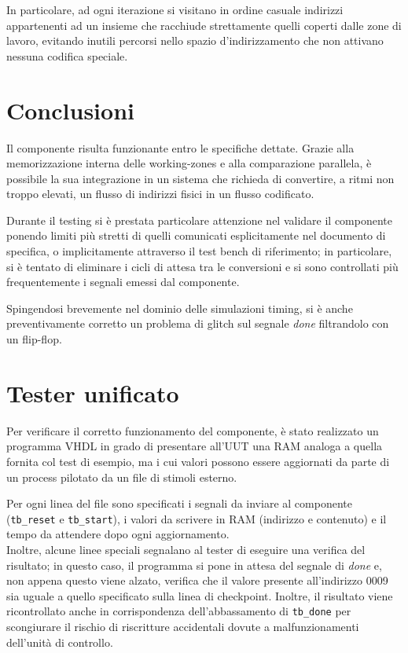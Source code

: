 \documentclass[11pt,a4paper]{article}
\begin{document}
In particolare, ad ogni iterazione si visitano in ordine casuale indirizzi appartenenti ad un insieme che racchiude strettamente quelli coperti dalle
zone di lavoro, evitando inutili percorsi nello spazio d'indirizzamento che non attivano nessuna codifica speciale.

\section{Conclusioni}
Il componente risulta funzionante entro le specifiche dettate. Grazie alla memorizzazione interna delle working-zones e alla comparazione parallela, è
possibile la sua integrazione in un sistema che richieda di convertire, a ritmi non troppo elevati, un flusso di indirizzi fisici in un flusso codificato.

Durante il testing si è prestata particolare attenzione nel validare il componente ponendo limiti più stretti di quelli comunicati esplicitamente nel
documento di specifica, o implicitamente attraverso il test bench di riferimento; in particolare, si è tentato di eliminare i cicli di attesa tra le
conversioni e si sono controllati più frequentemente i segnali emessi dal componente.

Spingendosi brevemente nel dominio delle simulazioni timing, si è anche preventivamente corretto un problema di glitch sul segnale \emph{done} filtrandolo
con un flip-flop.

\newpage

\appendix
\section{Tester unificato}
\label{appendix:unitest}
Per verificare il corretto funzionamento del componente, è stato realizzato un programma VHDL in grado di presentare all'UUT una RAM analoga a quella
fornita col test di esempio, ma i cui valori possono essere aggiornati da parte di un process pilotato da un file di stimoli esterno.

Per ogni linea del file sono specificati i segnali da inviare al componente (\lstinline{tb_reset} e \lstinline{tb_start}), i valori da scrivere in RAM
(indirizzo e contenuto) e il tempo da attendere dopo ogni aggiornamento.\\
Inoltre, alcune linee speciali segnalano al tester di eseguire una verifica del risultato; in questo caso, il programma si pone in attesa del segnale di
\emph{done} e, non appena questo viene alzato, verifica che il valore presente all'indirizzo 0009 sia uguale a quello specificato sulla linea di
checkpoint. Inoltre, il risultato viene ricontrollato anche in corrispondenza dell'abbassamento di \lstinline{tb_done} per scongiurare il rischio di
riscritture accidentali dovute a malfunzionamenti dell'unità di controllo.
\end{document}
